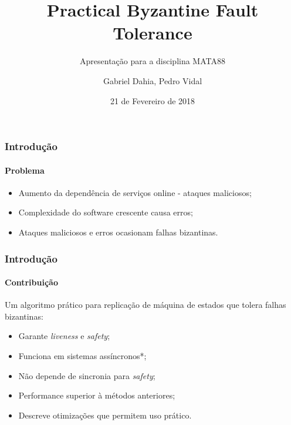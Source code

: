 \documentclass{beamer}
\title{Practical Byzantine Fault Tolerance}
\subtitle{Apresentação para a disciplina MATA88}
\author{Gabriel Dahia, Pedro Vidal}
\date{21 de Fevereiro de 2018}
\institute{Universidade Federal da Bahia}
\begin{document}
\frame{\maketitle}

\begin{frame}
  \frametitle{Introdução}
  \framesubtitle{Problema}

  \begin{itemize}
    \item
      Aumento da dependência de serviços online - ataques maliciosos;

      \pause
    \item
      Complexidade do software crescente causa erros;

      \pause
    \item
      Ataques maliciosos e erros ocasionam falhas bizantinas.
  \end{itemize}
\end{frame}

\begin{frame}
  \frametitle{Introdução}
  \framesubtitle{Contribuição}

  Um algoritmo prático para replicação de máquina de estados que tolera falhas bizantinas:
  \begin{itemize}
      \pause
    \item
      Garante \textit{liveness} e \textit{safety};

      \pause
    \item
      Funciona em sistemas assíncronos*;

      \pause
    \item
      Não depende de sincronia para \textit{safety};
      
      \pause
    \item
      Performance superior à métodos anteriores;

      \pause
    \item
      Descreve otimizações que permitem uso prático.
  \end{itemize}
\end{frame}
\end{document}
